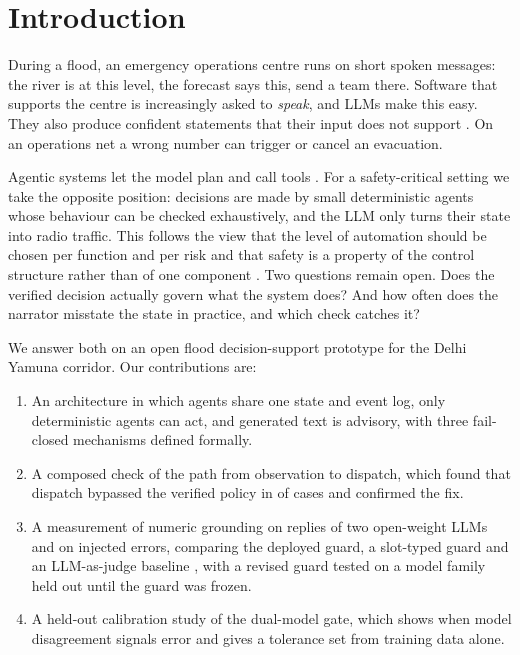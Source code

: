 \documentclass[conference]{IEEEtran}
\begin{document}
\section{Introduction}
During a flood, an emergency operations centre runs on short spoken messages: the river is at this level, the forecast says this, send a team there. Software that supports the centre is increasingly asked to \emph{speak}, and LLMs make this easy. They also produce confident statements that their input does not support \cite{Ji2023}. On an operations net a wrong number can trigger or cancel an evacuation.

Agentic systems let the model plan and call tools \cite{Yao2023,Schick2023,Wu2024}. For a safety-critical setting we take the opposite position: decisions are made by small deterministic agents whose behaviour can be checked exhaustively, and the LLM only turns their state into radio traffic. This follows the view that the level of automation should be chosen per function and per risk \cite{Parasuraman2000} and that safety is a property of the control structure rather than of one component \cite{Leveson2011}. Two questions remain open. Does the verified decision actually govern what the system does? And how often does the narrator misstate the state in practice, and which check catches it?

We answer both on an open flood decision-support prototype for the Delhi Yamuna corridor. Our contributions are:
\begin{enumerate}
\item An architecture in which agents share one state and event log, only deterministic agents can act, and generated text is advisory, with three fail-closed mechanisms defined formally.
\item A composed check of the path from observation to dispatch, which found that dispatch bypassed the verified policy in \EtoEViolBefore{} of \EtoECases{} cases and confirmed the fix.
\item A measurement of numeric grounding on \LiveN{} replies of two open-weight LLMs and on injected errors, comparing the deployed guard, a slot-typed guard and an LLM-as-judge baseline \cite{Zheng2023}, with a revised guard tested on a model family held out until the guard was frozen.
\item A held-out calibration study of the dual-model gate, which shows when model disagreement signals error and gives a tolerance set from training data alone.
\end{enumerate}
\end{document}
